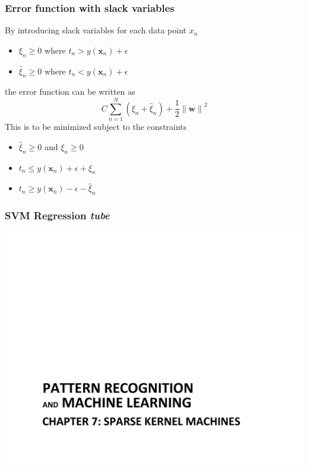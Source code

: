 \documentclass[t,14pt]{beamer}
\begin{document}
\begin{frame}
  \frametitle{Error function with slack variables}
  By introducing slack variables for each data point $x_n$\\
  \begin{itemize}
    \item {$\xi_n \geq 0$ where $t_n > y(\mathbf{x}_n) + 
  \epsilon$} 
    \item {$\widehat{\xi}_n \geq 0$ where $t_n < y(\mathbf{x}_n) 
  + \epsilon$} 
  \end{itemize}
  the error function can be written as
  \begin{equation}
    C \sum\limits_{n=1}^N (\xi_n + \widehat{\xi}_n) + 
        \frac{\displaystyle 1}{\displaystyle 2}{\lVert \mathbf{w} \rVert}^2
  \end{equation}
  This is to be minimized subject to the constraints
  \begin{itemize}
    \item {$\widehat{\xi}_n \geq 0$ and $\xi_n \geq 0$}
    \item {$t_n \leq y(\mathbf{x}_n) + \epsilon + \xi_n$}
    \item {$t_n \geq y(\mathbf{x}_n) - \epsilon - \widehat{\xi}_n$}
  \end{itemize}
\end{frame}

\begin{frame}
  \frametitle{SVM Regression \textit{tube}}
  \includegraphics[trim=2cm 0cm 0cm 5cm,clip,scale=0.5,page=9]{Chapter_7.pdf}
\end{frame}
\end{document}
